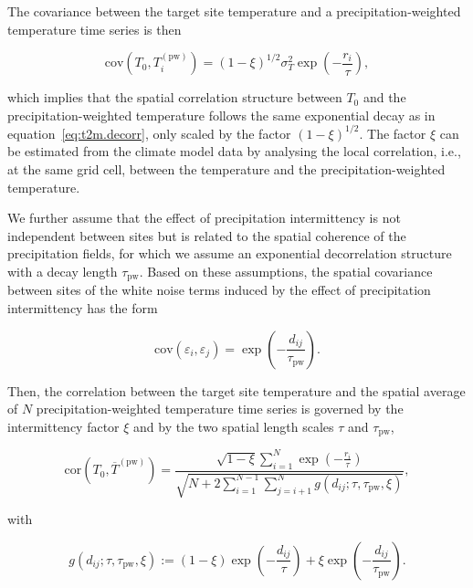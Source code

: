\documentclass[draft]{agujournal2019}
\begin{document}
The covariance between the target site temperature and a precipitation-weighted
temperature time series is then
\begin{linenomath*}
\begin{equation}
\label{eq:t2m.pw.decorr}
\mathrm{cov}(T_0,T_i^{\mathrm{(pw)}})=
(1-\xi)^{1/2}\sigma_T^2\exp{\left(-\frac{r_i}{\tau}\right)},
\end{equation}
\end{linenomath*}
%
which implies that the spatial correlation structure between $T_0$ and the
precipitation-weighted temperature follows the same exponential decay as in
equation~\eqref{eq:t2m.decorr}, only scaled by the factor $(1-\xi)^{1/2}$. The
factor $\xi$ can be estimated from the climate model data by analysing the local
correlation, i.e., at the same grid cell, between the temperature and the
precipitation-weighted temperature.

We further assume that the effect of precipitation intermittency is not
independent between sites but is related to the spatial coherence of the
precipitation fields, for which we assume an exponential decorrelation structure
with a decay length $\tau_{\mathrm{pw}}$. Based on these assumptions, the
spatial covariance between sites of the white noise terms induced by the effect
of precipitation intermittency has the form
%
\begin{linenomath*}
\begin{equation}
\label{eq:noise.cov}
\mathrm{cov}(\varepsilon_i,\varepsilon_j)=
\exp{\left(-\frac{d_{ij}}{\tau_{\mathrm{pw}}}\right)}.
\end{equation}
\end{linenomath*}
%
Then, the correlation between the target site temperature and the spatial
average of $N$ precipitation-weighted temperature time series is governed by the
intermittency factor $\xi$ and by the two spatial length scales $\tau$ and
$\tau_{\mathrm{pw}}$,
%
\begin{linenomath*}
\begin{equation}
\label{eq:t2m.pw.corr}
\mathrm{cor}\left(T_0,\overline{T}^{\mathrm{(pw)}}\right)=
\frac
{\sqrt{1-\xi}\sum_{i=1}^{N}\exp{\left(-\frac{r_i}{\tau}\right)}}
{\sqrt{N + 2\sum_{i=1}^{N-1}\sum_{j=i+1}^{N}
  g(d_{ij}; \tau, \tau_{\mathrm{pw}}, \xi)}},
\end{equation}
\end{linenomath*}
%
with
\begin{linenomath*}
\begin{equation}
\label{eq:exp.fun}
g(d_{ij}; \tau, \tau_{\mathrm{pw}}, \xi):=
(1-\xi)\exp{\left(-\frac{d_{ij}}{\tau}\right)} +
\xi\exp{\left(-\frac{d_{ij}}{\tau_{\mathrm{pw}}}\right)}.
\end{equation}
\end{linenomath*}
\end{document}
